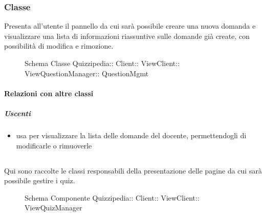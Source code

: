 \subsubsection{Classe }
Presenta all'utente il pannello da cui sarà possibile creare una nuova domanda e visualizzare una lista di informazioni riassuntive sulle domande già create, con possibilità di modifica e rimozione.
\begin{figure}[H]
\centering
\noindent{}
\caption[Schema Classe QuestionMgmt]{Schema Classe Quizzipedia:: Client:: ViewClient:: ViewQuestionManager:: QuestionMgmt}
\end{figure}
\paragraph{Relazioni con altre classi}
\subparagraph{Uscenti}
\begin{itemize}
\item usa  per visualizzare la lista delle domande del docente, permettendogli di modificarle o rimuoverle
\end{itemize}
\subsection{}
Qui sono raccolte le classi responsabili della presentazione delle pagine da cui sarà possibile gestire i quiz.
\begin{figure}[H]
\centering
\noindent{}
\caption[Schema Componente ViewQuizManager]{Schema Componente Quizzipedia:: Client:: ViewClient:: ViewQuizManager}
\end{figure}
